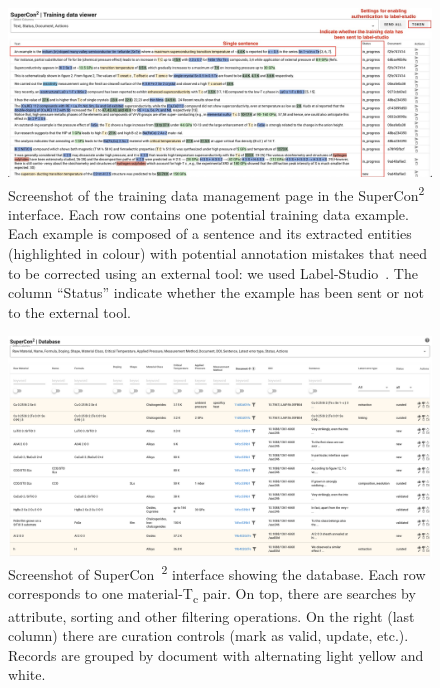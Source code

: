 \documentclass[]{interact}
\theoremstyle{plain} %
\theoremstyle{definition}
\theoremstyle{remark}
\begin{document}
\begin{figure}[ht]
  \centering
  \includegraphics[width=1\textwidth]{images/training-data-viewer} 
  \caption{Screenshot of the training data management page in the SuperCon\textsuperscript{2} interface. Each row contains one potential training data example. Each example is composed of a sentence and its extracted entities (highlighted in colour) with potential annotation mistakes that need to be corrected using an external tool: we used Label-Studio~\cite{Label_Studio}. The column ``Status'' indicate whether the example has been sent or not to the external tool.}
  \label{fig:training-data-view}
\end{figure}

\begin{figure}[ht]
  \centering
  \includegraphics[width=1\textwidth]{images/supercon-curation-database} 
  \caption{Screenshot of SuperCon~\textsuperscript{2} interface showing the database. Each row corresponds to one material-T\textsubscript{c} pair. On top, there are searches by attribute, sorting and other filtering operations. On the right (last column) there are curation controls (mark as valid, update, etc.).   Records are grouped by document with alternating light yellow and white. }
  \label{fig:curation-interface-database}
\end{figure}
\end{document}
